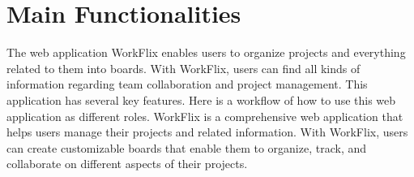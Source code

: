 \section{Main Functionalities}

The web application WorkFlix enables users to organize projects and everything related to them into boards.
With WorkFlix, users can find all kinds of information regarding team collaboration and project management.
This application has several key features. Here is a workflow of how to use this web application as different roles.
WorkFlix is a comprehensive web application that helps users manage their projects and related information. With WorkFlix, users can create customizable boards that enable them to organize, track, and collaborate on different aspects of their projects.




